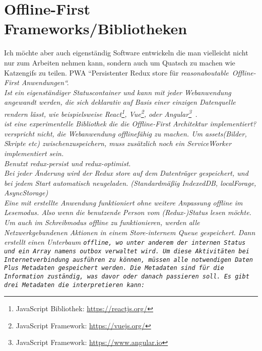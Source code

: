 \section{\label{sec:frameworks}Offline-First Frameworks/Bibliotheken}
  Ich möchte aber auch eigenständig Software entwickeln die man vielleicht nicht nur zum Arbeiten nehmen kann, sondern auch um Quatsch zu machen wie Katzengifs zu teilen.
  \Gls{PWA}
  \cite{realm}
  ``Persistenter Redux store für \it{reasonaboutable}\texttrademark ~Offline-First Anwendungen``. \\
  Ist ein eigenständiger Statuscontainer und kann mit jeder Webanwendung angewandt werden, die sich \it{deklarativ auf Basis einer einzigen Datenquelle rendern lässt}, wie beispielsweise React\footnote{JavaScript Bibliothek: \url{https://reactjs.org/}}, Vue\footnote{JavaScript Framework: \url{https://vuejs.org/}}, oder Angular\footnote{JavaScript Framework: \url{https://www.angular.io}}~\cite{redux-offline-compabilaty}.\\
  ist eine experimentelle Bibliothek die die Offline-First Architektur implementiert?\\
   verspricht nicht, die Webanwendung offlinefähig zu machen. Um \it{assets}(Bilder, Skripte etc) zwischenzuspeichern, muss zusätzlich noch ein ServiceWorker implementiert sein.\\
  Benutzt redux-persist und redux-optimist.\\
  Bei jeder Änderung wird der Redux store auf dem Datenträger gespeichert, und bei jedem Start automatisch neugeladen. (Standardmäßig IndexedDB, localForage, AsyncStorage)\\
  Eine mit  erstellte Anwendung funktioniert ohne weitere Anpassung offline im Lesemodus. Also wenn die benutzende Person vom (Redux-)Status lesen möchte.
  Um auch im Schreibmodus offline zu funktionieren, werden alle Netzwerkgebundenen Aktionen in einem Store-internem \gls{Queue} gespeichert. Dann erstellt  einen Unterbaum \tt{offline}, wo unter anderem der internen Status und ein Array namens \tt{outbox} verwaltet wird. Um diese Aktivitäten bei Internetverbindung ausführen zu können, müssen alle notwendigen Daten Plus Metadaten gespeichert werden. Die Metadaten sind für die Information zuständig, was davor oder danach passieren soll. Es gibt drei Metadaten die  interpretieren kann:\\
